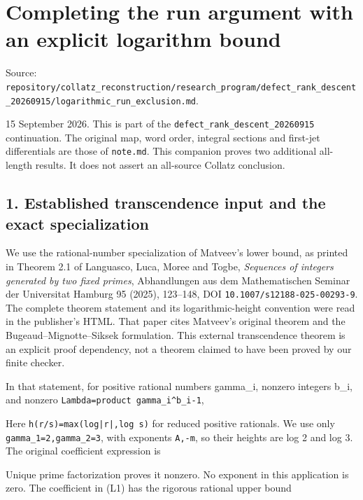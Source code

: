 \chapter{Completing the run argument with an explicit logarithm bound}
{\small\sffamily Source: \nolinkurl{repository/collatz_reconstruction/research_program/defect_rank_descent_20260915/logarithmic_run_exclusion.md}.\par}


15 September 2026. This is part of the
\nolinkurl{defect_rank_descent_20260915} continuation. The original map,
word order, integral sections and first-jet differentials are those of
\nolinkurl{note.md}. This companion proves two additional all-length
results. It does not assert an all-source Collatz conclusion.

\section{1. Established transcendence input and the exact
specialization}

We use the rational-number specialization of Matveev's lower bound, as
printed in Theorem 2.1 of Languasco, Luca, Moree and Togbe,
\emph{Sequences of integers generated by two fixed primes}, Abhandlungen
aus dem Mathematischen Seminar der Universitat Hamburg 95 (2025),
123--148, DOI \nolinkurl{10.1007/s12188-025-00293-9}. The complete
theorem statement and its logarithmic-height convention were read in the
publisher's HTML. That paper cites Matveev's original theorem and the
Bugeaud--Mignotte--Siksek formulation. This external transcendence
theorem is an explicit proof dependency, not a theorem claimed to have
been proved by our finite checker.

In that statement, for positive rational numbers gamma\_i, nonzero
integers b\_i, and nonzero \nolinkurl{Lambda=product gamma_i^b_i-1},


Here \nolinkurl{h(r/s)=max(log|r|,log s)} for reduced positive
rationals. We use only \nolinkurl{gamma_1=2,gamma_2=3}, with exponents
\nolinkurl{A,-m}, so their heights are log 2 and log 3. The original
coefficient expression is


Unique prime factorization proves it nonzero. No exponent in this
application is zero. The coefficient in (L1) has the rigorous rational
upper bound

